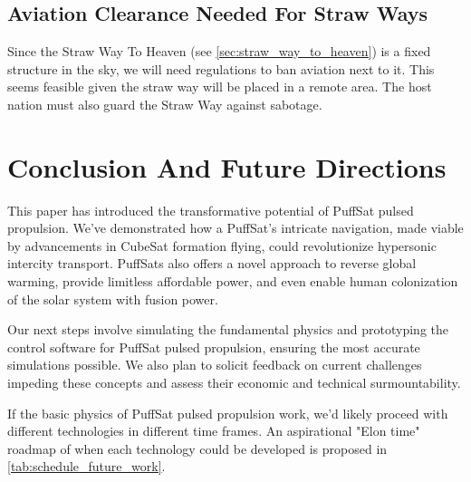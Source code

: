 \documentclass{article}
\begin{document}
\subsection{Aviation Clearance Needed For Straw Ways}
Since the Straw Way To Heaven (see \autoref{sec:straw_way_to_heaven}) is a fixed structure in the sky, we will need regulations to ban aviation next to it.   This seems feasible given the straw way will be placed in a remote area.   The host nation must also guard the Straw Way against sabotage.


\section{Conclusion And Future Directions}
This paper has introduced the transformative potential of PuffSat pulsed propulsion. We've demonstrated how a PuffSat's intricate navigation, made viable by advancements in CubeSat formation flying, could revolutionize hypersonic intercity transport.  PuffSats also offers a novel approach to reverse global warming, provide limitless affordable power, and even enable human colonization of the solar system with fusion power. 

Our next steps involve simulating the fundamental physics and prototyping the control software for PuffSat pulsed propulsion, ensuring the most accurate simulations possible. We also plan to solicit feedback on current challenges impeding these concepts and assess their economic and technical surmountability.

If the basic physics of PuffSat pulsed propulsion work, we'd likely proceed with different technologies in different time frames.  An aspirational "Elon time" \cite{wiktionary_elon_time} roadmap of when each technology could be  developed is proposed in \autoref{tab:schedule_future_work}.
\end{document}

